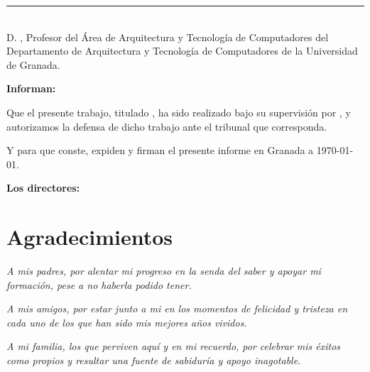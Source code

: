 \noindent\rule[-1ex]{\textwidth}{2pt}\\[4.5ex]

D. \textbf{\myProf}, Profesor del Área de Arquitectura y Tecnología de Computadores del Departamento de Arquitectura y Tecnología de Computadores de la Universidad de Granada.


\vspace{0.5cm}

\textbf{Informan:}

\vspace{0.5cm}

Que el presente trabajo, titulado \textit{\textbf{\myTitle}},
ha sido realizado bajo su supervisión por \textbf{\myName}, y autorizamos la defensa de dicho trabajo ante el tribunal
que corresponda.

\vspace{0.5cm}

Y para que conste, expiden y firman el presente informe en Granada a \today.

\vspace{1cm}

\textbf{Los directores:}

\vspace{5cm}

\noindent \textbf{\myProf}

\chapter*{Agradecimientos}
\thispagestyle{empty}

       \vspace{1cm}


\textit{A mis padres, por alentar mi progreso en la senda del saber y apoyar mi formación, pese a no haberla podido tener.}

\textit{A mis amigos, por estar junto a mi en los momentos de felicidad y tristeza en cada uno de los que han sido mis mejores años vividos.}

\textit{A mi familia, los que perviven aquí y en mi recuerdo, por celebrar mis éxitos como propios y resultar una fuente de sabiduría y apoyo inagotable.}

